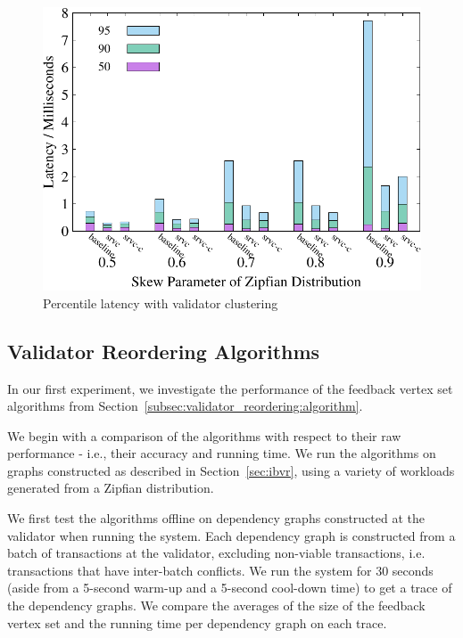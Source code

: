 \begin{figure}[t]
\begin{minipage}[b]{0.32\linewidth}
    \end{minipage}
    \begin{minipage}[b]{0.32\linewidth}
        \centering
        \includegraphics[width=\textwidth]{./exp_fig/cluster/percent95_latency}
        \vspace{-2em}
        \caption{Percentile latency with validator clustering}
        \label{fig:cluster:p95}
    \end{minipage}
\end{figure}

\subsection{Validator Reordering Algorithms}


In our first experiment, we investigate the performance of the feedback vertex set algorithms from Section~\ref{subsec:validator_reordering:algorithm}. 

We begin with a comparison of the algorithms with respect to their raw performance - i.e., their accuracy and running time. We run the algorithms on graphs constructed as described in Section~\ref{sec:ibvr}, using a variety of workloads generated from a Zipfian distribution. 

We first test the algorithms offline on dependency graphs constructed at the validator when running the system. Each dependency graph is constructed from a batch of transactions at the validator, excluding non-viable transactions, i.e. transactions that have inter-batch conflicts. We run the system for 30 seconds (aside from a 5-second  warm-up and  a 5-second cool-down time) to get a trace of the dependency graphs. We compare the averages of the size of the feedback vertex set and the running time per dependency graph on each trace.

